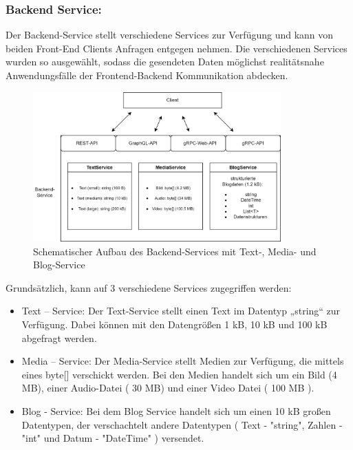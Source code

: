 \subsubsection*{Backend Service:}
Der Backend-Service stellt verschiedene Services zur Verfügung und kann von beiden Front-End Clients Anfragen entgegen nehmen.
Die verschiedenen Services wurden so ausgewählt, sodass die gesendeten Daten möglichst realitätsnahe Anwendungsfälle der Frontend-Backend Kommunikation abdecken.

\begin{figure}[htbp]
	\centering
	\includegraphics[width=0.85\textwidth]{images/BackendService.png}
	\caption{Schematischer Aufbau des Backend-Services mit Text-, Media- und Blog-Service}
	\label{fig:backendservice}
\end{figure}

Grundsätzlich, kann auf 3 verschiedene Services zugegriffen werden:

\begin{itemize}
	\item Text – Service: 
	Der Text-Service stellt einen Text im Datentyp „string“ zur Verfügung. Dabei können mit den Datengrößen 1 kB, 10 kB und 100 kB abgefragt werden.
	
	\item Media – Service:
	Der Media-Service stellt Medien zur Verfügung, die mittels eines byte[] verschickt werden. Bei den Medien handelt sich um ein Bild (4 MB), einer Audio-Datei ( 30 MB) und einer Video Datei ( 100 MB ). 
	
	\item Blog - Service: 
	Bei dem Blog Service handelt sich um einen 10 kB großen Datentypen, der verschachtelt andere Datentypen ( Text - "string", Zahlen - "int" und Datum - "DateTime" ) versendet.
	
\end{itemize}

